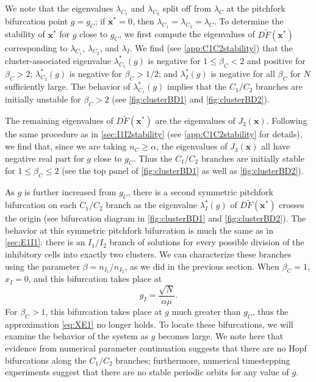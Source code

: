 \documentclass[reqno]{siamonline190516}
\newcommand{\xvec}{\mathbf{x}}
\begin{document}
We note that the eigenvalues $\lambda_{C_1}$ and $\lambda_{C_2}$ split off from $\lambda_C$ at the pitchfork bifurcation point $g = g_C$; if $\xvec^* = 0$, then $\lambda_{C_1} = \lambda_{C_2} = \lambda_C$. To determine the stability of $\xvec^*$ for $g$ close to $g_C$, we first compute the eigenvalues of $D\tilde{F}(\xvec^*)$ corresponding to $\lambda_{C_1}$, $\lambda_{C_2}$, and $\lambda_I$. We find (see \cref{app:C1C2stability}) that the cluster-associated eigenvalue $\lambda_{C_1}^*(g)$ is negative for $1 \leq \beta_C < 2$ and positive for $\beta_C > 2$; $\lambda_{C_2}^*(g)$ is negative for $\beta_C  > 1/2$; and $\lambda_{I}^*(g)$ is negative for all $\beta_C$ for $N$ sufficiently large. The behavior of $\lambda_{C_1}^*(g)$ implies that the $C_1/C_2$ branches are initially unstable for $\beta_C > 2$ (see \cref{fig:clusterBD1} and \cref{fig:clusterBD2}). 

The remaining eigenvalues of $D\tilde{F}(\xvec^*)$ are the eigenvalues of $J_3(\xvec)$. Following the same procedure as in \cref{sec:I1I2stability} (see \cref{app:C1C2stability} for details), we find that, since we are taking $n_C \geq \alpha$, the eigenvalues of $J_3(\xvec)$ all have negative real part for $g$ close to $g_C$. Thus the $C_1/C_2$ branches are initially stable for $1 \leq \beta_C \leq 2$ (see the top panel of \cref{fig:clusterBD1} as well as \cref{fig:clusterBD2}).

As $g$ is further increased from $g_C$, there is a second symmetric pitchfork bifurcation on each $C_1/C_2$ branch as the eigenvalue $\lambda_I^*(g)$ of $D\tilde{F}(\xvec^*)$ crosses the origin (see bifurcation diagram in \cref{fig:clusterBD1} and \cref{fig:clusterBD2}). The behavior at this symmetric pitchfork bifurcation is much the same as in \cref{sec:E1I1}: there is an $I_1/I_2$ branch of solutions for every possible division of the inhibitory cells into exactly two clusters. We can characterize these branches using the parameter $\beta = n_{I_1}/n_{I_2}$, as we did in the previous section. When $\beta_C = 1$, $x_I = 0$, and this bifurcation takes place at 
\begin{equation}\label{eq:gpitchinhbeta1}
g_I = \frac{\sqrt{N}}{\alpha \mu}.
\end{equation}
For $\beta_C > 1$, this bifurcation takes place at $g$ much greater than $g_C$, thus the approximation \cref{eq:XE1} no longer holds. To locate these bifurcations, we will examine the behavior of the system as $g$ becomes large. We note here that evidence from numerical parameter continuation suggests that there are no Hopf bifurcations along the $C_1/C_2$ branches; furthermore, numerical timestepping experiments suggest that there are no stable periodic orbits for any value of $g$.
\end{document}
